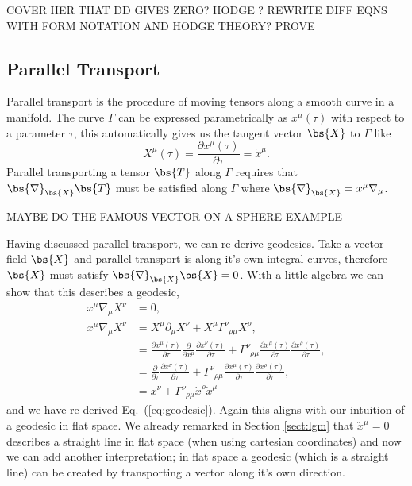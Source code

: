 COVER HER THAT DD GIVES ZERO?
HODGE ? REWRITE DIFF EQNS WITH FORM NOTATION AND HODGE THEORY?
PROVE 




\subsection{Parallel Transport}


Parallel transport is the procedure of moving tensors along a smooth curve in a manifold. The curve $\Gamma$ can be expressed parametrically as $x^\mu(\tau)$ with respect to a parameter $\tau$, this automatically gives us the tangent vector $\bs{X}$ to $\Gamma$ like 
\begin{equation}
X^\mu(\tau) = \frac{\partial x^\mu(\tau)}{\partial \tau} = \dot{x}^\mu.
\end{equation}
Parallel transporting a tensor $\bs{T}$ along $\Gamma$ requires that $\bs{\nabla}_{\bs{X}} \bs{T}$ must be satisfied along $\Gamma$ where $\bs{\nabla}_{\bs{X}}=x^\mu \nabla_\mu$.

MAYBE DO THE FAMOUS VECTOR ON A SPHERE EXAMPLE

Having discussed parallel transport, we can re-derive geodesics. Take a vector field $\bs{X}$ and parallel transport is along it's own integral curves, therefore $\bs{X}$ must satisfy $\bs{\nabla}_{\bs{X}}\bs{X}=0$. With a little algebra we can show that this describes a geodesic,
\begin{align}
x^\mu \nabla_\mu X^\nu &=0, \\
x^\mu \nabla_\mu X^\nu &= X^\mu \partial_\mu X^\nu + X^\mu \Gamma^{\nu}_{\,\,\,\rho\mu}X^\rho, \\
&=\frac{\partial x^\mu(\tau)}{\partial \tau}\frac{\partial}{\partial x^\mu} \frac{\partial x^\nu(\tau)}{\partial \tau} + \Gamma^{\nu}_{\,\,\,\rho\mu}\frac{\partial x^\mu(\tau)}{\partial \tau}\frac{\partial x^\rho(\tau)}{\partial \tau},\\
&=\frac{\partial}{\partial \tau} \frac{\partial x^\nu(\tau)}{\partial \tau} + \Gamma^{\nu}_{\,\,\,\rho\mu}\frac{\partial x^\mu(\tau)}{\partial \tau}\frac{\partial x^\rho(\tau)}{\partial \tau},\\
\label{eq:geo}&= \ddot{x}^\nu + \Gamma^{\nu}_{\,\,\,\rho\mu}\dot{x}^\rho\dot{x}^\mu
\end{align}
and we have re-derived Eq.~(\ref{eq:geodesic}). Again this aligns with our intuition of a geodesic in flat space. We already remarked in Section \ref{sect:lgm} that $\ddot{x}^\mu=0$ describes a straight line in flat space (when using cartesian coordinates) and now we can add another interpretation; in flat space a geodesic (which is a straight line) can be created by transporting a vector along it's own direction.
